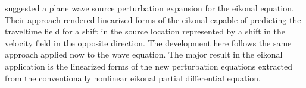 \begin{comment}
The typical layout and design of seismic acquisition allows for high redundancy in coverage conveniently represented by the
common midpoint fold, and this redundancy implies data dependency resulting in measurement 
 connection that exists
in the data space. In fact, under
certain assumptions, this connection can be expressed in a concise
mathematical form of a partial differential equation. The theoretical
analysis of this equation allows us to explain and predict the data
transformation between different sources. The partial differential equation, introduced here, describes the process of
 source location perturbation. In fact, data evolution as a function of changes in acquisition parameters goes back to the development
of normal moveout and the transformation of common-offset
seismic gathers from one constant offset to another
\cite[]{GPR30-06-08130828}. \cite{GEO61-06-18461858} identified offset
continuation (OC) with a whole family of prestack continuation
operators, such as shot continuation \cite[]{SEG-1993-0673}, dip
moveout as a continuation to zero offset \cite[]{DMObook,GEO61-04-09470963}, and
three-dimensional azimuth moveout \cite[]{GEO63-02-05740588}. Even residual versions of these mapping equations are presented by
\cite{GPR53-01-00010012}, as well as, residuals between azimuths [\cite{GEO69-02-05540561}]. All these methods
are based on a geometrical optics development using constant velocity approximations.
\end{comment}

\cite{tariqds} suggested a plane wave source perturbation expansion for the eikonal equation. Their approach rendered
linearized forms of the eikonal  capable of predicting the traveltime field for a shift in the source location
represented by a shift in the velocity field in the opposite direction. The development here follows
the same approach applied now to the wave equation. The major result in the eikonal application is the linearized forms of 
the new perturbation equations extracted from the conventionally
nonlinear eikonal partial differential equation.

